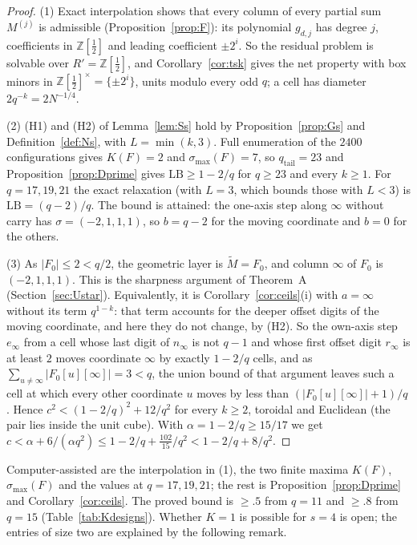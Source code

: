 \documentclass[11pt]{amsart}
\theoremstyle{definition}
\theoremstyle{plain}
\newcommand{\Z}{\mathbb{Z}}
\begin{document}
\begin{proof}
(1) Exact interpolation shows that every column of every partial sum $M^{(j)}$ is admissible (Proposition~\ref{prop:F}): its polynomial $g_{d,j}$ has degree $j$, coefficients in $\Z[\frac12]$ and leading coefficient $\pm2^i$. So the residual problem is solvable over $R'=\Z[\frac12]$, and Corollary~\ref{cor:tsk} gives the net property with box minors in $\Z[\frac12]^\times=\{\pm2^i\}$, units modulo every odd $q$; a cell has diameter $2q^{-k}=2N^{-1/4}$.

(2) (H1) and (H2) of Lemma~\ref{lem:Ss} hold by Proposition~\ref{prop:Gs} and Definition~\ref{def:Ns}, with $L=\min(k,3)$. Full enumeration of the $2400$ configurations gives $K(F)=2$ and $\sigma_{\max}(F)=7$, so $q_{\mathrm{tail}}=23$ and Proposition~\ref{prop:Dprime} gives $\mathrm{LB}\ge1-2/q$ for $q\ge23$ and every $k\ge1$. For $q=17,19,21$ the exact relaxation (with $L=3$, which bounds those with $L<3$) is $\mathrm{LB}=(q-2)/q$. The bound is attained: the one-axis step along $\infty$ without carry has $\sigma=(-2,1,1,1)$, so $b=q-2$ for the moving coordinate and $b=0$ for the others.

(3) As $|F_0|\le2<q/2$, the geometric layer is $\tilde M=F_0$, and column $\infty$ of $F_0$ is $(-2,1,1,1)$. This is the sharpness argument of Theorem~A (Section~\ref{sec:Ustar}). Equivalently, it is Corollary~\ref{cor:ceils}(i) with $a=\infty$ without its term $q^{1-k}$: that term accounts for the deeper offset digits of the moving coordinate, and here they do not change, by (H2). So the own-axis step $e_\infty$ from a cell whose last digit of $n_\infty$ is not $q-1$ and whose first offset digit $r_\infty$ is at least $2$ moves coordinate $\infty$ by exactly $1-2/q$ cells, and as $\sum_{u\ne\infty}|F_0[u][\infty]|=3<q$, the union bound of that argument leaves such a cell at which every other coordinate $u$ moves by less than $(|F_0[u][\infty]|+1)/q$. Hence $c^2<(1-2/q)^2+12/q^2$ for every $k\ge2$, toroidal and Euclidean (the pair lies inside the unit cube). With $\alpha=1-2/q\ge15/17$ we get $c<\alpha+6/(\alpha q^2)\le1-2/q+\frac{102}{15}/q^2<1-2/q+8/q^2$.
\end{proof}

Computer-assisted are the interpolation in (1), the two finite maxima $K(F)$, $\sigma_{\max}(F)$ and the values at $q=17,19,21$; the rest is Proposition~\ref{prop:Dprime} and Corollary~\ref{cor:ceils}. The proved bound is $\ge.5$ from $q=11$ and $\ge.8$ from $q=15$ (Table~\ref{tab:Kdesigns}). Whether $K=1$ is possible for $s=4$ is open; the entries of size two are explained by the following remark.
\end{document}
